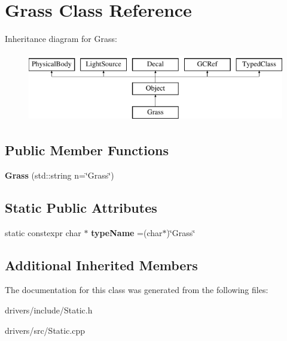 \hypertarget{classGrass}{}\section{Grass Class Reference}
\label{classGrass}
Inheritance diagram for Grass\+:\begin{figure}[H]
\begin{center}
\leavevmode
\includegraphics[height=3.000000cm]{classGrass}
\end{center}
\end{figure}
\subsection*{Public Member Functions}
\begin{DoxyCompactItemize}
\item 
\hypertarget{classGrass_a09378b8347074a59fe6a5485a174841a}{}{\bfseries Grass} (std\+::string n=\char`\"{}Grass\char`\"{})\label{classGrass_a09378b8347074a59fe6a5485a174841a}

\end{DoxyCompactItemize}
\subsection*{Static Public Attributes}
\begin{DoxyCompactItemize}
\item 
\hypertarget{classGrass_a4c182f101c0eff9c9e1178bcf52f13af}{}static constexpr char $\ast$ {\bfseries type\+Name} =(char$\ast$)\char`\"{}Grass\char`\"{}\label{classGrass_a4c182f101c0eff9c9e1178bcf52f13af}

\end{DoxyCompactItemize}
\subsection*{Additional Inherited Members}


The documentation for this class was generated from the following files\+:\begin{DoxyCompactItemize}
\item 
drivers/include/Static.\+h\item 
drivers/src/Static.\+cpp\end{DoxyCompactItemize}
